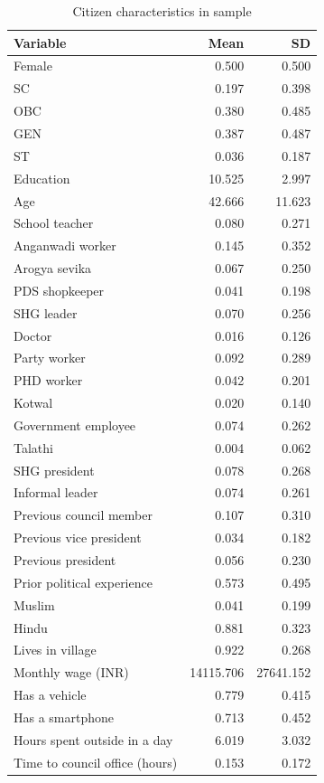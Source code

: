 \begin{table}

\caption{Citizen characteristics in sample}
\centering
\begin{tabular}[t]{lrr}
\toprule
Variable & Mean & SD\\
\midrule
Female & 0.500 & 0.500\\
SC & 0.197 & 0.398\\
OBC & 0.380 & 0.485\\
GEN & 0.387 & 0.487\\
ST & 0.036 & 0.187\\
\addlinespace
Education & 10.525 & 2.997\\
Age & 42.666 & 11.623\\
School teacher & 0.080 & 0.271\\
Anganwadi worker & 0.145 & 0.352\\
Arogya sevika & 0.067 & 0.250\\
\addlinespace
PDS shopkeeper & 0.041 & 0.198\\
SHG leader & 0.070 & 0.256\\
Doctor & 0.016 & 0.126\\
Party worker & 0.092 & 0.289\\
PHD worker & 0.042 & 0.201\\
\addlinespace
Kotwal & 0.020 & 0.140\\
Government employee & 0.074 & 0.262\\
Talathi & 0.004 & 0.062\\
SHG president & 0.078 & 0.268\\
Informal leader & 0.074 & 0.261\\
\addlinespace
Previous council member & 0.107 & 0.310\\
Previous vice president & 0.034 & 0.182\\
Previous president & 0.056 & 0.230\\
Prior political experience & 0.573 & 0.495\\
Muslim & 0.041 & 0.199\\
\addlinespace
Hindu & 0.881 & 0.323\\
Lives in village & 0.922 & 0.268\\
Monthly wage (INR) & 14115.706 & 27641.152\\
Has a vehicle & 0.779 & 0.415\\
Has a smartphone & 0.713 & 0.452\\
\addlinespace
Hours spent outside in a day & 6.019 & 3.032\\
Time to council office (hours) & 0.153 & 0.172\\
\bottomrule
\end{tabular}
\end{table}
